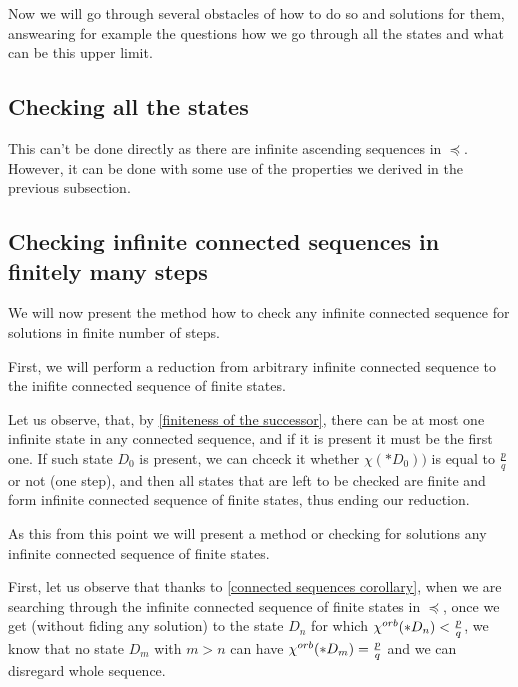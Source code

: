 Now we will go through several obstacles of how to do so and solutions for them, answearing for 
example the 
questions how we go through all the states and what can be this upper limit. 


\subsection{Checking all the states}
This can't be done directly as there are infinite ascending sequences in $\preceq$. 
However, it can be done with some use of the properties we derived in the previous subsection.
\subsection{Checking infinite connected sequences in finitely many steps}
\label{searching idea connected}
We will now present the method how to check any infinite connected sequence for solutions 
in finite number of steps.


First, we will perform a reduction from 
arbitrary infinite connected sequence to the inifite connected sequence of finite states. 

Let us observe, that, by \ref{finiteness of the successor}, 
there can be at most one infinite state in 
any connected sequence, and if it is present it must be the first one. If such state 
$D_0$ is present, 
we can chceck it whether $\chi(*D_0))$ is equal to $\frac{p}{q}$ or not (one step), 
and then all states that are left to be checked are finite and form infinite 
connected sequence of finite states, thus ending our reduction. 

As this from this point we will present a method or checking for solutions any 
infinite connected sequence of finite states.

First, let us observe that thanks to \ref{connected sequences corollary}, 
when we are searching through the infinite connected sequence of finite states in 
$\preceq$, once we get (without fiding any solution) 
to the state $D_n$ for which ${\chi^{orb}(*D_n)} < \frac{p}{q}$, we know 
that no state $D_m$ with $m>n$ can have ${\chi^{orb}(*D_m)} = \frac{p}{q}$ 
and we can disregard whole sequence. 

